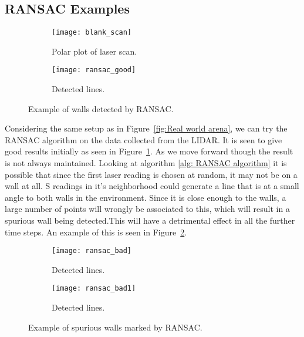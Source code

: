 \subsection{RANSAC Examples}
 \begin{figure}[h!]
     \centering
     \begin{subfigure}[b]{0.45\textwidth}
     
 	    \texttt{[image: blank\_scan]}
         \caption{Polar plot of laser scan.}
     \end{subfigure}
     \quad %
     \begin{subfigure}[b]{0.45\textwidth}
         \texttt{[image: ransac\_good]}
		 \caption{Detected lines.}
     \end{subfigure}%
         \caption{Example of walls detected by RANSAC.}
         \label{fig: ransac_good}
 \end{figure}
 Considering the same setup as in Figure~\ref{fig:Real world arena}, we can try the RANSAC algorithm on the data collected from the LIDAR. It is seen to give good results initially as seen in Figure~\ref{fig: ransac_good}. As we move forward though the result is not always maintained. Looking at algorithm \ref{alg: RANSAC algorithm} it is possible that since the first laser reading is chosen at random, it may not be on a wall at all. S readings in it's neighborhood could generate a line that is at a small angle to both walls in the environment. Since it is close enough to the walls, a large number of points will wrongly be associated to this, which will result in a spurious wall being detected.This will have a detrimental effect in all the further time steps. An example of this is seen in Figure~\ref{fig: ransac_bad}.
 \begin{figure}[h!]
     \centering
     \begin{subfigure}[b]{0.45\textwidth}
     
 	    \texttt{[image: ransac\_bad]}
        \caption{Detected lines.}
     \end{subfigure}
     \quad %
     \begin{subfigure}[b]{0.45\textwidth}
         \texttt{[image: ransac\_bad1]}
		 \caption{Detected lines.}
     \end{subfigure}%
         \caption{Example of spurious walls marked by RANSAC.}
         \label{fig: ransac_bad}
 \end{figure}
